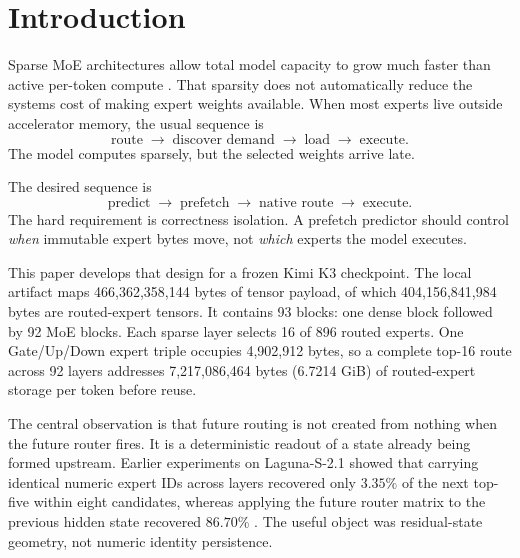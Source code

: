 \documentclass[11pt]{article}
\begin{document}
\begin{abstract}
The result is not a universal throughput claim; several recent systems report larger gains on different models and hardware. The contribution is a distinct exact-by-construction design point: post-hoc recurrent trajectory learning, comparison against the true frozen causal base, one-shot heldout validation, reversible multi-tier residency, advisory-only page-cache streaming, and a guarded champion/challenger path for later sidecar improvement without foreground self-modification.
\end{abstract}

\section{Introduction}

Sparse MoE architectures allow total model capacity to grow much faster than active per-token compute \citep{shazeer2017,kimi2026}. That sparsity does not automatically reduce the systems cost of making expert weights available. When most experts live outside accelerator memory, the usual sequence is
\begin{equation}
\text{route}\;\longrightarrow\;\text{discover demand}\;\longrightarrow\;\text{load}\;\longrightarrow\;\text{execute}.
\end{equation}
The model computes sparsely, but the selected weights arrive late.

The desired sequence is
\begin{equation}
\text{predict}\;\longrightarrow\;\text{prefetch}\;\longrightarrow\;\text{native route}\;\longrightarrow\;\text{execute}.
\end{equation}
The hard requirement is correctness isolation. A prefetch predictor should control \emph{when} immutable expert bytes move, not \emph{which} experts the model executes.

This paper develops that design for a frozen Kimi K3 checkpoint. The local artifact maps 466,362,358,144 bytes of tensor payload, of which 404,156,841,984 bytes are routed-expert tensors. It contains 93 blocks: one dense block followed by 92 MoE blocks. Each sparse layer selects 16 of 896 routed experts. One Gate/Up/Down expert triple occupies 4,902,912 bytes, so a complete top-16 route across 92 layers addresses 7,217,086,464 bytes (6.7214 GiB) of routed-expert storage per token before reuse.

The central observation is that future routing is not created from nothing when the future router fires. It is a deterministic readout of a state already being formed upstream. Earlier experiments on Laguna-S-2.1 showed that carrying identical numeric expert IDs across layers recovered only $3.35\%$ of the next top-five within eight candidates, whereas applying the future router matrix to the previous hidden state recovered $86.70\%$ \citep{castorenaDragon2026}. The useful object was residual-state geometry, not numeric identity persistence.
\end{document}
